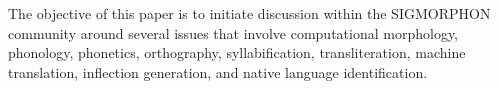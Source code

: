 The objective of this paper is to initiate discussion within the SIGMORPHON community around several issues that involve computational morphology, phonology, phonetics, orthography, syllabification, transliteration, machine translation, inflection generation, and native language identification.
